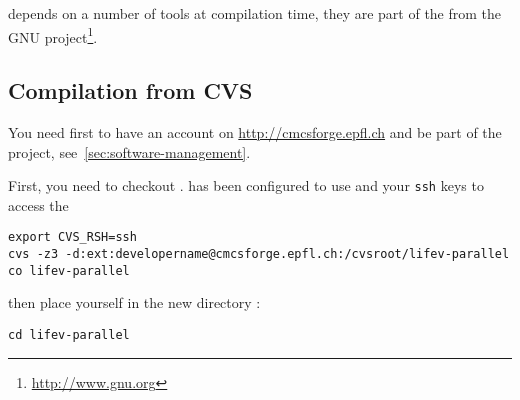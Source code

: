 \lifev depends on a number of tools at compilation time, they are part
of the  from the GNU
project\footnote{\url{http://www.gnu.org}}.




\subsection{Compilation from CVS}
\label{sec:compile-cvs}
You need first to have an account on \url{http://cmcsforge.epfl.ch} and
be part of the \lifev project, see~\ref{sec:software-management}.

\noindent First, you need to checkout \lifev.  has
been configured to use  and your \verb!ssh! keys to
access the

\begin{verbatim}
export CVS_RSH=ssh
cvs -z3 -d:ext:developername@cmcsforge.epfl.ch:/cvsroot/lifev-parallel co lifev-parallel
\end{verbatim}

then place yourself in the new directory :

\begin{verbatim}
cd lifev-parallel
\end{verbatim}

